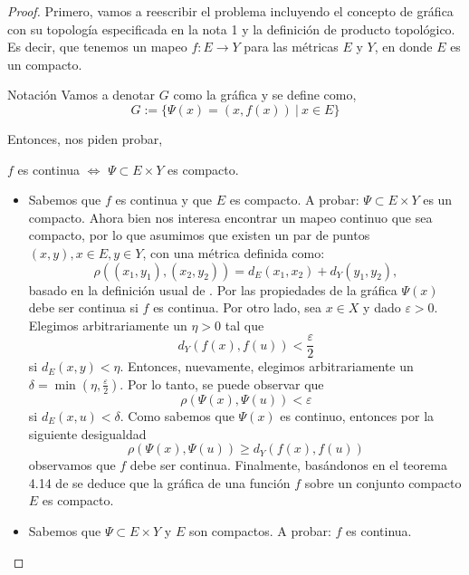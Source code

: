 \begin{proof}

Primero, vamos a reescribir el problema incluyendo el concepto de gráfica con su topología especificada en la nota 1 y la definición de producto topológico. Es decir, que tenemos un mapeo $f: E\to Y$ para las métricas $E$ y $Y$, en donde $E$ es un compacto.
\begin{noter}{Notación}
Vamos a denotar $G$ como la gráfica y se define como, $$G:=\{\Psi(x)=(x,f(x)) \ | \ x\in E\}$$
\end{noter}
Entonces, nos piden probar,
\begin{center}
   $f$ es continua $\Longleftrightarrow$ $\Psi\subset E\times Y$ es compacto. 
\end{center}
\begin{itemize}
    \item [\fbox{$\to$}] Sabemos que $f$ es continua y que $E$ es compacto. A probar: $\Psi\subset E\times Y$ es un compacto.\newline\newline 
    Ahora bien nos interesa encontrar un mapeo continuo que sea compacto, por lo que asumimos que existen un par de puntos $(x, y), x \in E, y \in Y$, con una métrica definida como: $$\rho\left(\left(x_{1}, y_{1}\right),\left(x_{2}, y_{2}\right)\right)=d_{E}\left(x_{1}, x_{2}\right)+d_{Y}\left(y_{1}, y_{2}\right),$$ basado en la definición usual de \cite{rudin1976principles}. Por las propiedades de la gráfica $\Psi(x)$ debe ser continua si $f$ es continua. Por otro lado, sea $x \in X$ y dado $\varepsilon>0$. Elegimos arbitrariamente un $\eta>0$ tal que $$d_{Y}(f(x), f(u))<\frac{\varepsilon}{2}$$ si $d_{E}(x, y)<\eta .$ Entonces, nuevamente, elegimos arbitrariamente un $\delta=\min \left(\eta, \frac{\varepsilon}{2}\right) .$  Por lo tanto, se puede observar que 
    $$\rho(\Psi(x), \Psi(u))<\varepsilon$$
    si $d_{E}(x, u)<\delta$. 
     Como sabemos que $\Psi(x)$ es continuo, entonces por la siguiente desigualdad
$$\rho(\Psi(x), \Psi(u)) \geq d_{Y}(f(x), f(u))$$ observamos que $f$ debe ser continua. 
Finalmente, basándonos en el teorema 4.14 de \cite{rudin1976principles} se deduce que la gráfica de una función $f$ sobre un conjunto compacto $E$ es compacto. 


    \item [\fbox{$\gets$}] Sabemos que $\Psi\subset E\times Y$ y $E$ son compactos. A probar: $f$ es continua.\newline\newline 
    

\end{itemize}
\end{proof}
